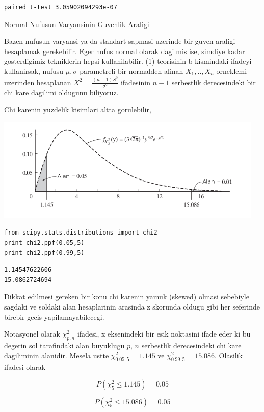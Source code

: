 \documentclass[12pt,fleqn]{article}\usepackage{../common}
\begin{document}
\begin{verbatim}
paired t-test 3.05902094293e-07
\end{verbatim}

Normal Nufusun Varyansinin Guvenlik Araligi

Bazen nufusun varyansi ya da standart sapmasi uzerinde bir guven araligi
hesaplamak gerekebilir. Eger nufus normal olarak dagilmis ise, simdiye
kadar gosterdigimiz tekniklerin hepsi kullanilabilir. (1) teorisinin b
kismindaki ifadeyi kullanirsak, nufusu $\mu,\sigma$ parametreli bir
normalden alinan $X_1,..,X_n$ orneklemi uzerinden hesaplanan
$X^2 = \frac{(n-1)S^2}{\sigma^2}$ ifadesinin $n-1$ serbestlik derecesindeki bir
chi kare dagilimi oldugunu biliyoruz.

Chi karenin yuzdelik kisimlari altta gorulebilir,

\includegraphics[height=5cm]{chi_1.png}

\begin{verbatim}
from scipy.stats.distributions import chi2
print chi2.ppf(0.05,5)
print chi2.ppf(0.99,5)
\end{verbatim}

\begin{verbatim}
1.14547622606
15.0862724694
\end{verbatim}

Dikkat edilmesi gereken bir konu chi karenin yamuk (skewed) olmasi
sebebiyle sagdaki ve soldaki alan hesaplarinin arasinda z skorunda oldugu
gibi her seferinde birebir gecis yapilamayabilecegi. 

Notasyonel olarak $\chi_{p,n}^2$ ifadesi, x eksenindeki bir esik noktasini
ifade eder ki bu degerin sol tarafindaki alan buyuklugu $p$, $n$ serbestlik
derecesindeki chi kare dagiliminin alanidir. Mesela ustte $\chi_{0.05,5}^2 =
1.145$ 
ve $\chi_{0.99,5}^2 = 15.086$. Olasilik ifadesi olarak 

$$ P(\chi_5^2 \le 1.145) = 0.05 $$

$$ P(\chi_5^2 \le 15.086) = 0.05 $$
\end{document}
